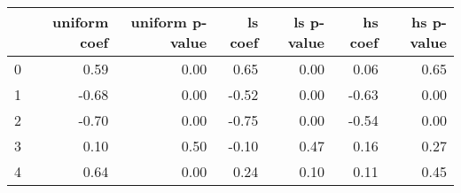 \begin{tabular}{lrrrrrr}
\toprule
 & uniform coef & uniform p-value & ls coef & ls p-value & hs coef & hs p-value \\
\midrule
0 & 0.59 & 0.00 & 0.65 & 0.00 & 0.06 & 0.65 \\
1 & -0.68 & 0.00 & -0.52 & 0.00 & -0.63 & 0.00 \\
2 & -0.70 & 0.00 & -0.75 & 0.00 & -0.54 & 0.00 \\
3 & 0.10 & 0.50 & -0.10 & 0.47 & 0.16 & 0.27 \\
4 & 0.64 & 0.00 & 0.24 & 0.10 & 0.11 & 0.45 \\
\bottomrule
\end{tabular}
